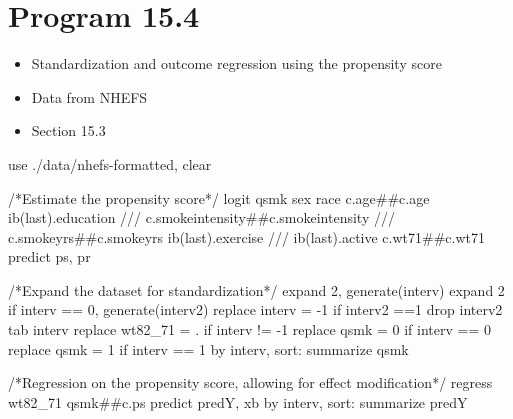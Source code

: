 \documentclass[
  10pt,
  a4paper,
]{book}
\newenvironment{Shaded}{\begin{snugshade}}{\end{snugshade}}
\newcommand{\CommentTok}[1]{\textcolor[rgb]{0.37,0.37,0.37}{#1}}
\newcommand{\FunctionTok}[1]{\textcolor[rgb]{0.28,0.35,0.67}{#1}}
\newcommand{\KeywordTok}[1]{\textcolor[rgb]{0.00,0.46,0.62}{#1}}
\newcommand{\NormalTok}[1]{\textcolor[rgb]{0.00,0.46,0.62}{#1}}
\providecommand{\tightlist}{%
  \setlength{\itemsep}{0pt}\setlength{\parskip}{0pt}}
\begin{document}
\section{Program 15.4}\label{program-15.4-1}

\begin{itemize}
\tightlist
\item
  Standardization and outcome regression using the propensity score
\item
  Data from NHEFS
\item
  Section 15.3
\end{itemize}

\begin{Shaded}
\begin{Highlighting}[]
\KeywordTok{use}\NormalTok{ ./}\KeywordTok{data}\NormalTok{/nhefs{-}formatted, }\KeywordTok{clear}

\CommentTok{/*Estimate the propensity score*/}
\KeywordTok{logit}\NormalTok{ qsmk sex race c.age\#\#c.age ib(}\FunctionTok{last}\NormalTok{).education }\CommentTok{///}
\NormalTok{  c.smokeintensity\#\#c.smokeintensity }\CommentTok{///}
\NormalTok{  c.smokeyrs\#\#c.smokeyrs ib(}\FunctionTok{last}\NormalTok{).exercise }\CommentTok{///}
\NormalTok{  ib(}\FunctionTok{last}\NormalTok{).active c.wt71\#\#c.wt71 }
\KeywordTok{predict}\NormalTok{ ps, pr}

\CommentTok{/*Expand the dataset for standardization*/}
\NormalTok{expand 2, }\KeywordTok{generate}\NormalTok{(interv)}
\NormalTok{expand 2 }\KeywordTok{if}\NormalTok{ interv == 0, }\KeywordTok{generate}\NormalTok{(interv2)}
\KeywordTok{replace}\NormalTok{ interv = {-}1 }\KeywordTok{if}\NormalTok{ interv2 ==1}
\KeywordTok{drop}\NormalTok{ interv2 }
\KeywordTok{tab}\NormalTok{ interv}
\KeywordTok{replace}\NormalTok{ wt82\_71 = . }\KeywordTok{if}\NormalTok{ interv != {-}1}
\KeywordTok{replace}\NormalTok{ qsmk = 0 }\KeywordTok{if}\NormalTok{ interv == 0}
\KeywordTok{replace}\NormalTok{ qsmk = 1 }\KeywordTok{if}\NormalTok{ interv == 1}
\KeywordTok{by}\NormalTok{ interv, }\KeywordTok{sort}\NormalTok{: }\KeywordTok{summarize}\NormalTok{ qsmk}

\CommentTok{/*Regression on the propensity score, allowing for effect modification*/}
\KeywordTok{regress}\NormalTok{ wt82\_71 qsmk\#\#c.ps}
\KeywordTok{predict}\NormalTok{ predY, }\KeywordTok{xb}
\KeywordTok{by}\NormalTok{ interv, }\KeywordTok{sort}\NormalTok{: }\KeywordTok{summarize}\NormalTok{ predY}


\end{Highlighting}
\end{Shaded}
\end{document}
